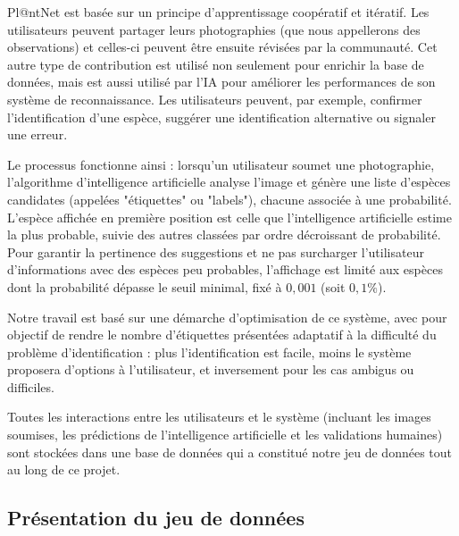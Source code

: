 \documentclass[a4paper,12pt]{article}
\begin{document}
\vspace{0.2cm}

Pl@ntNet est basée sur un principe d’apprentissage coopératif et itératif. Les utilisateurs peuvent partager leurs photographies (que nous appellerons des observations) et celles-ci peuvent être ensuite révisées par la communauté. Cet autre type de contribution est utilisé non seulement pour enrichir la base de données, mais est aussi utilisé par l’IA pour améliorer les performances de son système de reconnaissance. Les utilisateurs peuvent, par exemple, confirmer l'identification d'une espèce, suggérer une identification alternative ou signaler une erreur.

\vspace{0.2cm}

Le processus fonctionne ainsi : lorsqu'un utilisateur soumet une photographie, l'algorithme d'intelligence artificielle analyse l'image et génère une liste d'espèces candidates (appelées "étiquettes" ou "labels"), chacune associée à une probabilité. L'espèce affichée en première position est celle que l'intelligence artificielle estime la plus probable, suivie des autres classées par ordre décroissant de probabilité. Pour garantir la pertinence des suggestions et ne pas surcharger l'utilisateur d'informations avec des espèces peu probables, l'affichage est limité aux espèces dont la probabilité dépasse le seuil minimal, fixé à $0,001$ (soit $0,1\%$).

\vspace{0.2cm}

Notre travail est basé sur une démarche d'optimisation de ce système, avec pour objectif de rendre le nombre d'étiquettes présentées adaptatif à la difficulté du problème d'identification : plus l'identification est facile, moins le système proposera d'options à l'utilisateur, et inversement pour les cas ambigus ou difficiles.

\vspace{0.2cm}

Toutes les interactions entre les utilisateurs et le système (incluant les images soumises, les prédictions de l'intelligence artificielle et les validations humaines) sont stockées dans une base de données qui a constitué notre jeu de données tout au long de ce projet.


\subsection{Présentation du jeu de données}
\end{document}
